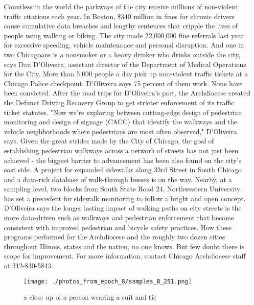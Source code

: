 \documentclass{article}%
\begin{document}
Countless in the world the parkways of the city receive millions of non{-}violent traffic citations each year. In Boston, \$340 million in fines for chronic drivers cause cumulative data breaches and lengthy sentences that cripple the lives of people using walking or biking. The city made 22,000,000 fine referrals last year for excessive speeding, vehicle maintenance and personal disruption.\newline%
And one in two Chicagoans is a nonsmoker or a heavy drinker who drinks outside the city, says Dan D'Oliveira, assistant director of the Department of Medical Operations for the City.\newline%
More than 5,000 people a day pick up non{-}violent traffic tickets at a Chicago Police checkpoint. D'Oliveira says 75 percent of them work. None have been convicted. After the road trips for D'Oliveira's part, the Archdiocese created the Defunct Driving Recovery Group to get stricter enforcement of its traffic ticket statutes.\newline%
"Now we're exploring between cutting{-}edge design of pedestrian monitoring and design of signage (CACC) that identify the walkways and the vehicle neighborhoods where pedestrians are most often observed," D'Oliveira says.\newline%
Given the great strides made by the City of Chicago, the goal of establishing pedestrian walkways across a network of streets has not just been achieved {-} the biggest barrier to advancement has been also found on the city's east side. A project for expanded sidewalks along 33rd Street in South Chicago and a data{-}rich database of walk{-}through busses is on the way. Nearby, at a sampling level, two blocks from South State Road 24, Northwestern University has set a precedent for sidewalk monitoring to follow a bright and open concept.\newline%
D'Oliveira says the longer lasting impact of walking paths on city streets is the more data{-}driven such as walkways and pedestrian enforcement that become consistent with improved pedestrian and bicycle safety practices.\newline%
How these programs performed for the Archdiocese and the roughly two dozen cities throughout Illinois, states and the nation, no one knows. But few doubt there is scope for improvement.\newline%
For more information, contact Chicago Archdiocese staff at 312{-}830{-}5843.\newline%

%


\begin{figure}[h!]%
\centering%
\texttt{[image: ./photos\_from\_epoch\_8/samples\_8\_251.png]}%
\caption{a close up of a person wearing a suit and tie}%
\end{figure}

%
\end{document}
